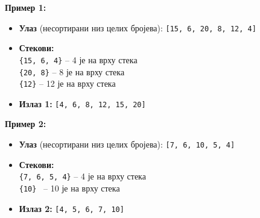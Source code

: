 \textbf{Пример 1:}
\begin{itemize}
    \item \textbf{Улаз} (несортирани низ целих бројева): \texttt{[15, 6, 20, 8, 12, 4]}
    \item \textbf{Стекови:} \\
    \texttt{\{15, 6, 4\}} \quad -- 4 је на врху стека \\
    \texttt{\{20, 8\}} \quad\quad -- 8 је на врху стека \\
    \texttt{\{12\}} \quad\quad\quad -- 12 је на врху стека
    \item \textbf{Излаз 1:} \texttt{[4, 6, 8, 12, 15, 20]}
\end{itemize}

\noindent \textbf{Пример 2:}
\begin{itemize}
    \item \textbf{Улаз} (несортирани низ целих бројева): \texttt{[7, 6, 10, 5, 4]}
    \item \textbf{Стекови:} \\
    \texttt{\{7, 6, 5, 4\}} \quad -- 4 је на врху стека \\
    \texttt{\{10\}} \quad\quad\quad\quad\:\, -- 10 је на врху стека
    \item \textbf{Излаз 2:} \texttt{[4, 5, 6, 7, 10]}
\end{itemize}

